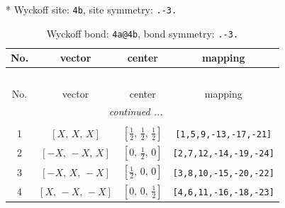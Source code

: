 \documentclass[fleqn,8pt]{jsarticle}
\begin{document}
* Wyckoff site: {\tt 4b}, site symmetry: {\tt .-3.}
\renewcommand{\arraystretch}{1.2}
\begin{longtable}{cccc}
\caption{Wyckoff bond: {\tt 4a@4b}, bond symmetry: {\tt .-3.}}
 \\
 \hline \hline
No. & vector & center & mapping \\ \hline \endfirsthead

\multicolumn{3}{l}{\tablename\ \thetable{}} \\
 \hline \hline
No. & vector & center & mapping \\ \hline \endhead

 \hline \hline
\multicolumn{3}{r}{\footnotesize\it continued ...} \\ \endfoot

 \hline \hline
\multicolumn{3}{r}{} \\ \endlastfoot

1 & $\left[ X,\, X,\, X \right]$ & $\left[ \frac{1}{2},\, \frac{1}{2},\, \frac{1}{2} \right]$ & {\tt [1,5,9,-13,-17,-21]} \\ \hline
2 & $\left[ - X,\, - X,\, X \right]$ & $\left[ 0,\, \frac{1}{2},\, 0 \right]$ & {\tt [2,7,12,-14,-19,-24]} \\ \hline
3 & $\left[ - X,\, X,\, - X \right]$ & $\left[ \frac{1}{2},\, 0,\, 0 \right]$ & {\tt [3,8,10,-15,-20,-22]} \\ \hline
4 & $\left[ X,\, - X,\, - X \right]$ & $\left[ 0,\, 0,\, \frac{1}{2} \right]$ & {\tt [4,6,11,-16,-18,-23]} \\
\end{longtable}
\renewcommand{\arraystretch}{1.2}
\end{document}
